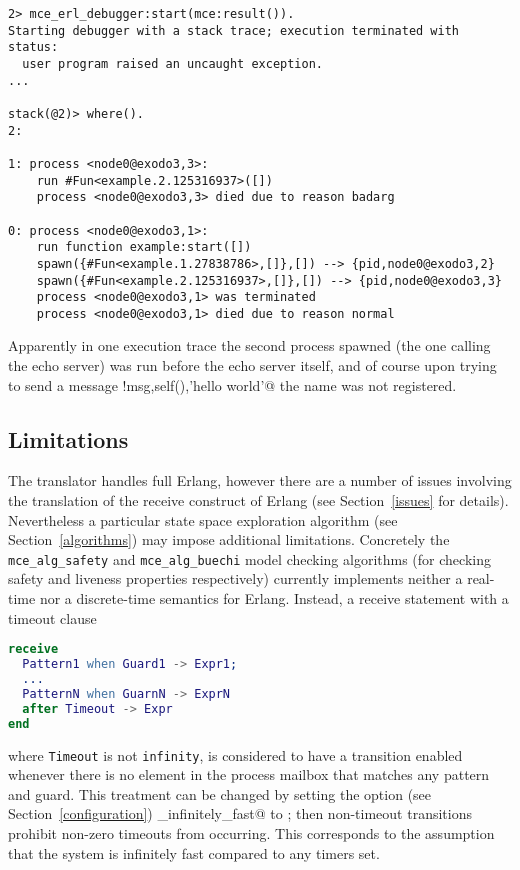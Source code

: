 \documentclass[a4paper]{article}
\begin{document}
\begin{lstlisting}
2> mce_erl_debugger:start(mce:result()).
Starting debugger with a stack trace; execution terminated with status:
  user program raised an uncaught exception.
...

stack(@2)> where().
2: 

1: process <node0@exodo3,3>: 
    run #Fun<example.2.125316937>([])
    process <node0@exodo3,3> died due to reason badarg

0: process <node0@exodo3,1>: 
    run function example:start([])
    spawn({#Fun<example.1.27838786>,[]},[]) --> {pid,node0@exodo3,2}
    spawn({#Fun<example.2.125316937>,[]},[]) --> {pid,node0@exodo3,3}
    process <node0@exodo3,1> was terminated
    process <node0@exodo3,1> died due to reason normal
\end{lstlisting}
\noindent
Apparently in one execution trace the second process spawned (the one calling
the echo server) was run before the echo server itself, and of course
upon trying to send a message \lstinline@echo!{msg,self(),'hello world'}@
the \lstinline@echo@ name was not registered.

\subsection{Limitations}

The translator handles full Erlang, however there are a number 
of issues involving the translation of the receive construct
of Erlang (see Section~\ref{issues} for details).
Nevertheless a particular state space exploration algorithm 
(see Section~\ref{algorithms}) may impose additional limitations.
Concretely the \lstinline{mce_alg_safety} and
\lstinline{mce_alg_buechi} model checking algorithms 
(for checking safety and liveness properties respectively)
currently implements neither a real-time nor a discrete-time
semantics for Erlang. Instead, a receive statement 
with a timeout clause
\begin{lstlisting}[language=Erlang]
receive
  Pattern1 when Guard1 -> Expr1;
  ...
  PatternN when GuarnN -> ExprN
  after Timeout -> Expr
end
\end{lstlisting}
where \lstinline{Timeout} is not \lstinline{infinity},
is considered to have a transition enabled whenever
there is no element in the process mailbox that matches any
pattern and guard. This treatment can be changed by setting
the option (see Section~\ref{configuration}) \lstinline@is_infinitely_fast@ 
to \lstinline@true@;
then non-timeout transitions prohibit non-zero timeouts from occurring.
This corresponds to the assumption that the system is infinitely
fast compared to any timers set.
\end{document}
